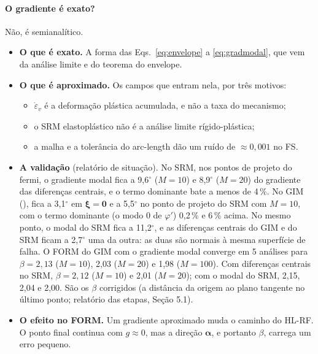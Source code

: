 \documentclass[11pt,a4paper]{article}
\newcommand{\xib}{\bm\xi}
\begin{document}
\paragraph{O gradiente é exato?} Não, é semianalítico.
\begin{itemize}
  \item \textbf{O que é exato.} A forma das Eqs.~\eqref{eq:envelope} a \eqref{eq:gradmodal}, que vem da análise
    limite e do teorema do envelope.
  \item \textbf{O que é aproximado.} Os campos que entram nela, por três motivos:
    \begin{itemize}
      \item $\dot\varepsilon_v$ é a deformação plástica acumulada, e não a taxa do mecanismo;
      \item o SRM elastoplástico não é a análise limite rígido-plástica;
      \item a malha e a tolerância do arc-length dão um ruído de $\approx 0{,}001$ no FS.
    \end{itemize}
  \item \textbf{A validação} (relatório de situação). No SRM, nos pontos de projeto do fermi, o gradiente modal fica a
    9,6$^\circ$ ($M = 10$) e 8,9$^\circ$ ($M = 20$) do gradiente das diferenças centrais, e o termo dominante bate a menos
    de 4\,\%. No GIM (), fica a 3,1$^\circ$ em $\xib = \bm 0$ e a 5,5$^\circ$
    no ponto de projeto do SRM com $M = 10$, com o termo dominante (o modo 0 de $\varphi'$) 0,2\,\% e 6\,\% acima.
    No mesmo ponto, o modal do SRM fica a 11,2$^\circ$, e as diferenças centrais do GIM e do SRM ficam a 2,7$^\circ$
    uma da outra: as duas são normais à mesma superfície de falha. O FORM do GIM com o gradiente modal converge em 5
    análises para $\beta = 2{,}13$ ($M = 10$), 2,03 ($M = 20$) e 1,98 ($M = 100$). Com diferenças centrais no SRM,
    $\beta = 2{,}12$ ($M = 10$) e 2,01 ($M = 20$); com o modal do SRM, 2,15, 2,04 e 2,00. São os $\beta$ corrigidos
    (a distância da origem ao plano tangente no último ponto; relatório das etapas, Seção 5.1).
  \item \textbf{O efeito no FORM.} Um gradiente aproximado muda o caminho do HL-RF. O ponto final continua com
    $g \approx 0$, mas a direção $\bm\alpha$, e portanto $\beta$, carrega um erro pequeno.
\end{itemize}
\end{document}
